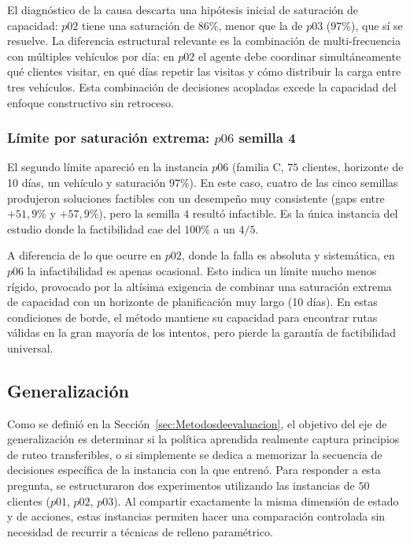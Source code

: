 El diagnóstico de la causa descarta una hipótesis inicial de saturación de capacidad: $p02$ tiene una saturación de $86\%$, menor que la de $p03$ ($97\%$), que sí se resuelve. La diferencia estructural relevante es la combinación de multi-frecuencia con múltiples vehículos por día: en $p02$ el agente debe coordinar simultáneamente qué clientes visitar, en qué días repetir las visitas y cómo distribuir la carga entre tres vehículos. Esta combinación de decisiones acopladas excede la capacidad del enfoque constructivo sin retroceso.  

\subsubsection{Límite por saturación extrema: $p06$ semilla 4}
El segundo límite apareció en la instancia $p06$ (familia C, $75$ clientes, horizonte de 10 días, un vehículo y saturación $97\%$). En este caso, cuatro de las cinco semillas produjeron soluciones factibles con un desempeño muy consistente (gaps entre $+51{,}9\%$ y $+57{,}9\%$), pero la semilla $4$ resultó infactible. Es la única instancia del estudio donde la factibilidad cae del $100\%$ a un $4/5$.

A diferencia de lo que ocurre en $p02$, donde la falla es absoluta y sistemática, en $p06$ la infactibilidad es apenas ocasional. Esto indica un límite mucho menos rígido, provocado por la altísima exigencia de combinar una saturación extrema de capacidad con un horizonte de planificación muy largo (10 días). En estas condiciones de borde, el método mantiene su capacidad para encontrar rutas válidas en la gran mayoría de los intentos, pero pierde la garantía de factibilidad universal.

\subsection{Generalización} \label{subsec:generalizacion}
Como se definió en la Sección~\ref{sec:Metodosdeevaluacion}, el objetivo del eje de generalización es determinar si la política aprendida realmente captura principios de ruteo transferibles, o si simplemente se dedica a memorizar la secuencia de decisiones específica de la instancia con la que entrenó. Para responder a esta pregunta, se estructuraron dos experimentos utilizando las instancias de $50$ clientes ($p01$, $p02$, $p03$). Al compartir exactamente la misma dimensión de estado y de acciones, estas instancias permiten hacer una comparación controlada sin necesidad de recurrir a técnicas de relleno paramétrico.

